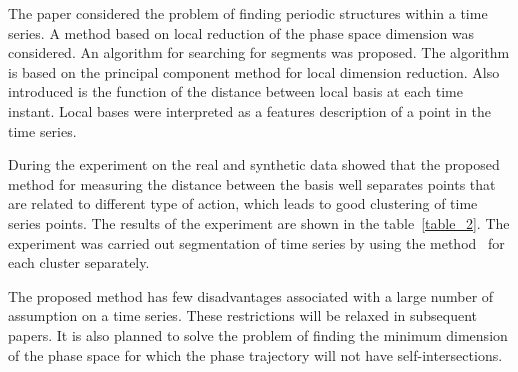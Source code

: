 \documentclass[12pt, twoside]{article}
\numberwithin{equation}{section}
\begin{document}
The paper considered the problem of finding periodic structures within a time series.
A method based on local reduction of the phase space dimension was considered.
An algorithm for searching for segments was proposed. 
The algorithm is based on the principal component method for local dimension reduction.
Also introduced is the function of the distance between local basis at each time instant. 
Local bases were interpreted as a features description of a point in the time series.

During the experiment on the real and synthetic data showed that the proposed method for measuring the distance between the basis well separates points that are related to different type of action, which leads to good clustering of time series points.
The results of the experiment are shown in the table~\ref{table_2}.
The experiment was carried out segmentation of time series by using the method~\cite{motrenko2015} for each cluster separately.

The proposed method has few disadvantages associated with a large number of assumption on a time series.
These restrictions will be relaxed in subsequent papers.
It is also planned to solve the problem of finding the minimum dimension of the phase space for which the phase trajectory will not have self-intersections.
\end{document}
